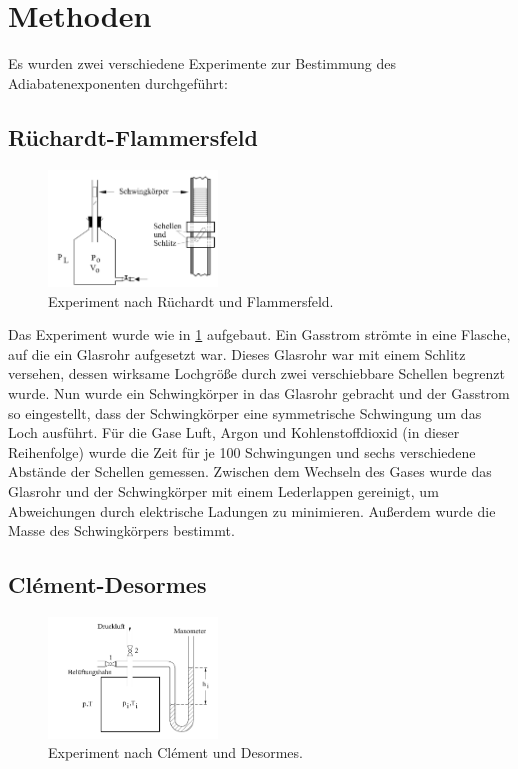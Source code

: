 \documentclass[
	a4paper,
	12pt,
	pagesize,
	ngerman
]{scrartcl}
\begin{document}
	\section{Methoden} \label{sec_Methoden}
	Es wurden zwei verschiedene Experimente zur Bestimmung des Adiabatenexponenten durchgeführt:
	\subsection{Rüchardt-Flammersfeld}
	
	\begin{figure}[H]
		\includegraphics[width=0.4\textwidth]{flammer}
		\centering
		\caption{Experiment nach Rüchardt und Flammersfeld. \cite{abbildungen}}
		\label{aufbau_flammer}
		\centering
	\end{figure} 

	Das Experiment wurde wie in \cref{aufbau_flammer} aufgebaut.
	Ein Gasstrom strömte in eine Flasche, auf die ein Glasrohr aufgesetzt war.
	Dieses Glasrohr war mit einem Schlitz versehen, dessen wirksame Lochgröße durch zwei verschiebbare Schellen begrenzt wurde.
	Nun wurde ein Schwingkörper in das Glasrohr gebracht und der Gasstrom so eingestellt, dass der Schwingkörper eine symmetrische Schwingung um das Loch ausführt.
	Für die Gase Luft, Argon und Kohlenstoffdioxid (in dieser Reihenfolge) wurde die Zeit für je 100 Schwingungen und sechs verschiedene Abstände der Schellen gemessen.
	Zwischen dem Wechseln des Gases wurde das Glasrohr und der Schwingkörper mit einem Lederlappen gereinigt, um Abweichungen durch elektrische Ladungen zu minimieren.
	Außerdem wurde die Masse des Schwingkörpers bestimmt.
	
	\subsection{Clément-Desormes}
	
	\begin{figure}[H]
		\includegraphics[width=0.4\textwidth]{clement}
		\centering
		\caption{Experiment nach Clément und Desormes. \cite{abbildungen}} %
		\label{aufbau_clement}
		\centering
	\end{figure} 
	
\end{document}
